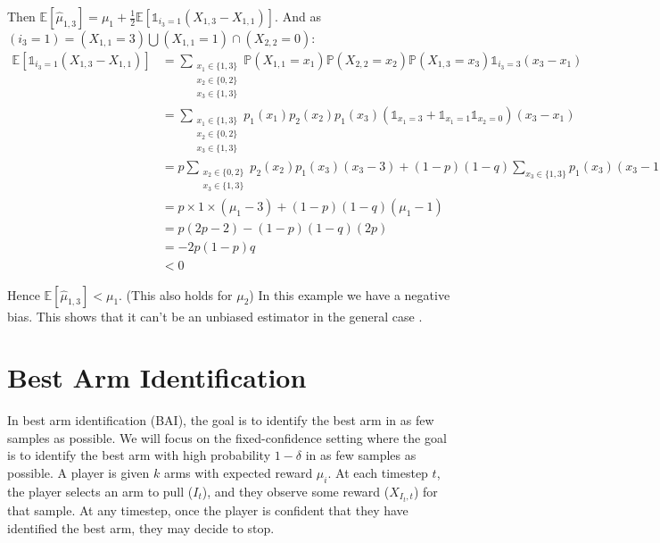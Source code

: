 \documentclass[a4paper]{article}
\newcommand{\wh}[1]{\widehat{#1}}
\begin{document}
Then $\mathbb{E}[\wh\mu_{1, 3}] = \mu_1 + \frac{1}{2}\mathbb{E}[\mathds{1}_{i_3 = 1}(X_{1, 3} - X_{1, 1})]$. And as $(i_3 = 1) = (X_{1,1} = 3)\bigcup(X_{1, 1} = 1)\cap(X_{2,2} = 0)$:
\begin{equation*}
    \begin{aligned}
        \mathbb{E}[\mathds{1}_{i_3 = 1}(X_{1, 3} - X_{1, 1})] & = \sum_{\substack{x_1 \in \{1, 3\}                      \\ x_2 \in \{0, 2\} \\ x_3 \in \{1, 3\}}} \mathbb{P}(X_{1, 1} = x_1)
        \mathbb{P}(X_{2, 2} = x_2)\mathbb{P}(X_{1, 3} = x_3)\mathds{1}_{i_3 = 3}(x_3 - x_1)                             \\
                                                              & = \sum_{\substack{x_1 \in \{1, 3\}                      \\ x_2 \in \{0, 2\} \\ x_3 \in \{1, 3\}}} p_1(x_1)
        p_2(x_2) p_1(x_3)(\mathds{1}_{x_1 = 3} + \mathds{1}_{x_1 = 1}\mathds{1}_{x_2 = 0})(x_3 - x_1)                   \\
                                                              & = p \sum_{\substack{x_2 \in \{0, 2\}                    \\ x_3 \in \{1, 3\}}} p_2(x_2)p_1(x_3) (x_3 - 3) +  (1-p)(1-q) \sum_{x_3 \in \{1, 3\}} p_1(x_3) (x_3 - 1)\\
                                                              & = p \times 1 \times (\mu_1 - 3) + (1-p)(1-q)(\mu_1 - 1) \\
                                                              & = p(2p - 2) - (1-p)(1-q)(2p)                            \\
                                                              & = -2p(1-p)q                                             \\
                                                              & < 0
    \end{aligned}
\end{equation*}

Hence $\boxed{\mathbb{E}[\wh\mu_{1, 3}] < \mu_1}$. (This also holds for $\mu_2$) In this example we have a negative bias.
This shows that it can't be an unbiased estimator in the general case .

\section{Best Arm Identification}
In best arm identification (BAI), the goal is to identify the best arm in as few samples as possible.
We will focus on the fixed-confidence setting where the goal is to identify the best arm with high probability $1-\delta$ in as few samples as possible.
A player is given $k$ arms with expected reward $\mu_i$. At each timestep $t$, the player selects an arm to pull ($I_t$), and they observe some reward ($X_{I_t,t}$) for that sample.
At any timestep, once the player is confident that they have identified the best arm, they may decide to stop.
\end{document}
